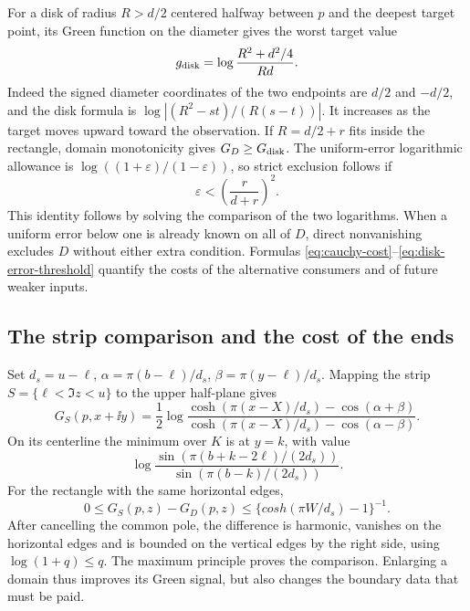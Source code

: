 For a disk of radius $R>d/2$ centered halfway between $p$ and the
deepest target point, its Green function on the diameter gives the
worst target value
\begin{equation}\label{eq:disk-cost}
 g_{\rm disk}=\log\frac{R^2+d^2/4}{Rd}.
\end{equation}
Indeed the signed diameter coordinates of the two endpoints are
$d/2$ and $-d/2$, and the disk formula is
$\log|(R^2-st)/(R(s-t))|$.
It increases as the target moves upward toward the observation.
If $R=d/2+r$ fits inside the rectangle, domain monotonicity gives
$G_D\ge G_{\rm disk}$. The uniform-error logarithmic allowance is
$\log((1+\varepsilon)/(1-\varepsilon))$, so strict exclusion follows if
\begin{equation}\label{eq:disk-error-threshold}
 \varepsilon<\left(\frac{r}{d+r}\right)^2.
\end{equation}
This identity follows by solving the comparison of the two logarithms.
When a uniform error below one is already known on all of $D$, direct
nonvanishing excludes $D$ without either extra condition. Formulas
\eqref{eq:cauchy-cost}--\eqref{eq:disk-error-threshold} quantify the
costs of the alternative consumers and of future weaker inputs.

\subsection{The strip comparison and the cost of the ends}

Set $d_s=u-\ell$, $\alpha=\pi(b-\ell)/d_s$,
$\beta=\pi(y-\ell)/d_s$. Mapping the strip
$S=\{\ell<\Im z<u\}$ to the upper half-plane gives
\begin{equation}\label{eq:strip-green}
 G_S(p,x+\ii y)=\frac12\log
 \frac{\cosh(\pi(x-X)/d_s)-\cos(\alpha+\beta)}
      {\cosh(\pi(x-X)/d_s)-\cos(\alpha-\beta)}.
\end{equation}
On its centerline the minimum over $K$ is at $y=k$, with value
\[
 \log\frac{\sin(\pi(b+k-2\ell)/(2d_s))}
                {\sin(\pi(b-k)/(2d_s))}.
\]
For the rectangle with the same horizontal edges,
\begin{equation}\label{eq:strip-rectangle}
 0\le G_S(p,z)-G_D(p,z)
 \le\{cosh(\pi W/d_s)-1\}^{-1}.
\end{equation}
After cancelling the common pole, the difference is harmonic, vanishes
on the horizontal edges and is bounded on the vertical edges by the
right side, using $\log(1+q)\le q$. The maximum principle proves
the comparison. Enlarging a domain thus improves its Green signal,
but also changes the boundary data that must be paid.

